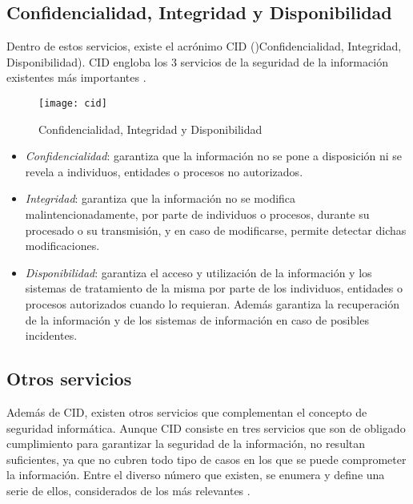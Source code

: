 \subsection[CID]{Confidencialidad, Integridad y Disponibilidad}

Dentro de estos servicios, existe el acrónimo CID ()Confidencialidad, Integridad, Disponibilidad). CID engloba los 3 servicios de la seguridad de la información existentes más importantes \cite{iso-27000}.

\begin{figure}[H]
	\centering
	\texttt{[image: cid]}
	\caption{Confidencialidad, Integridad y Disponibilidad}
	\label{fig:cid}
\end{figure}

\begin{itemize}
	\item \emph{Confidencialidad}: garantiza que la información no se pone a disposición ni se revela  a individuos, entidades o procesos no autorizados.
	\item \emph{Integridad}: garantiza que la información no se modifica malintencionadamente, por parte de individuos o procesos, durante su procesado o su transmisión, y en caso de modificarse, permite detectar dichas modificaciones.
	\item \emph{Disponibilidad}: garantiza el acceso y utilización de la información y los sistemas de tratamiento de la misma por parte de los individuos, entidades o procesos autorizados cuando lo requieran. Además garantiza la recuperación de la información y de los sistemas de información en caso de posibles incidentes.
\end{itemize}

\subsection{Otros servicios}

Además de CID, existen otros servicios que complementan el concepto de seguridad informática. Aunque CID consiste en tres servicios que son de obligado cumplimiento para garantizar la seguridad de la información, no resultan suficientes, ya que no cubren todo tipo de casos en los que se puede comprometer la información. Entre el diverso número  que existen, se enumera y define una serie de ellos, considerados de los más relevantes \cite{apuntes-isma}.

